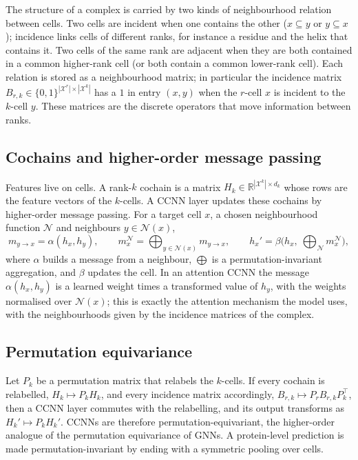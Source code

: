 \documentclass[11pt,a4paper]{article}
\theoremstyle{definition}
\begin{document}
The structure of a complex is carried by two kinds of neighbourhood relation
between cells. Two cells are incident when one contains the other ($x\subseteq y$
or $y\subseteq x$); incidence links cells of different ranks, for instance a
residue and the helix that contains it. Two cells of the same rank are adjacent
when they are both contained in a common higher-rank cell (or both contain a
common lower-rank cell). Each relation is stored as a neighbourhood matrix; in
particular the incidence matrix $B_{r,k}\in\{0,1\}^{|\mathcal{X}^r|\times|\mathcal{X}^k|}$
has a $1$ in entry $(x,y)$ when the $r$-cell $x$ is incident to the $k$-cell $y$.
These matrices are the discrete operators that move information between ranks.

\subsection{Cochains and higher-order message passing}

Features live on cells. A rank-$k$ cochain is a matrix
$H_k\in\mathbb{R}^{|\mathcal{X}^k|\times d_k}$ whose rows are the feature vectors
of the $k$-cells. A CCNN layer updates these cochains by higher-order message
passing. For a target cell $x$, a chosen neighbourhood function $\mathcal{N}$ and
neighbours $y\in\mathcal{N}(x)$,
\[
 m_{y\to x}=\alpha\!\left(h_x,h_y\right),\qquad
 m_x^{\mathcal{N}}=\bigoplus_{y\in\mathcal{N}(x)}m_{y\to x},\qquad
 h_x'=\beta\!\Big(h_x,\ \bigoplus_{\mathcal{N}}m_x^{\mathcal{N}}\Big),
\]
where $\alpha$ builds a message from a neighbour, $\bigoplus$ is a
permutation-invariant aggregation, and $\beta$ updates the cell. In an attention
CCNN the message $\alpha(h_x,h_y)$ is a learned weight times a transformed value
of $h_y$, with the weights normalised over $\mathcal{N}(x)$; this is exactly the
attention mechanism the model uses, with the neighbourhoods given by the
incidence matrices of the complex.

\subsection{Permutation equivariance}

Let $P_k$ be a permutation matrix that relabels the $k$-cells. If every cochain is
relabelled, $H_k\mapsto P_kH_k$, and every incidence matrix accordingly,
$B_{r,k}\mapsto P_rB_{r,k}P_k^{\top}$, then a CCNN layer commutes with the
relabelling, and its output transforms as $H_k'\mapsto P_kH_k'$. CCNNs are
therefore permutation-equivariant, the higher-order analogue of the permutation
equivariance of GNNs. A protein-level prediction is made permutation-invariant by
ending with a symmetric pooling over cells.
\end{document}
